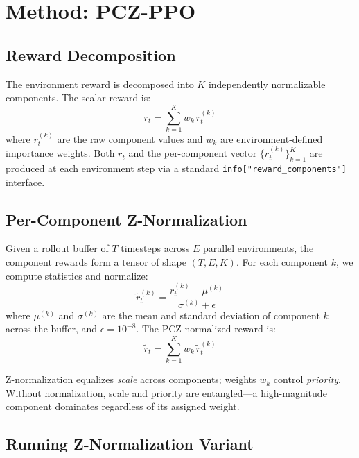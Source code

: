 \documentclass[11pt,a4paper]{article}
\begin{document}
\section{Method: PCZ-PPO}

\subsection{Reward Decomposition}

The environment reward is decomposed into $K$ independently normalizable components. The scalar reward is:
\begin{equation}
r_t = \sum_{k=1}^{K} w_k \, r_t^{(k)}
\end{equation}
where $r_t^{(k)}$ are the raw component values and $w_k$ are environment-defined importance weights. Both $r_t$ and the per-component vector $\{r_t^{(k)}\}_{k=1}^{K}$ are produced at each environment step via a standard \texttt{info["reward\_components"]} interface.

\subsection{Per-Component Z-Normalization}

Given a rollout buffer of $T$ timesteps across $E$ parallel environments, the component rewards form a tensor of shape $(T, E, K)$. For each component $k$, we compute statistics and normalize:
\begin{equation}
\tilde{r}_{t}^{(k)} = \frac{r_{t}^{(k)} - \mu^{(k)}}{\sigma^{(k)} + \epsilon}
\end{equation}
where $\mu^{(k)}$ and $\sigma^{(k)}$ are the mean and standard deviation of component $k$ across the buffer, and $\epsilon = 10^{-8}$. The PCZ-normalized reward is:
\begin{equation}
\tilde{r}_t = \sum_{k=1}^{K} w_k \, \tilde{r}_t^{(k)}
\end{equation}

Z-normalization equalizes \emph{scale} across components; weights $w_k$ control \emph{priority}. Without normalization, scale and priority are entangled---a high-magnitude component dominates regardless of its assigned weight.

\subsection{Running Z-Normalization Variant}
\end{document}
